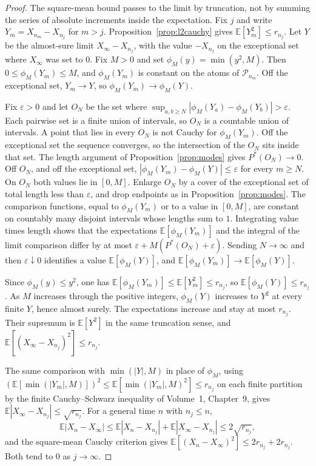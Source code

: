 \begin{proof}
The square-mean bound passes to the limit by truncation, not by summing the series of absolute increments inside the expectation. Fix $j$ and write $Y_m=X_{n_m}-X_{n_j}$ for $m>j$. Proposition~\ref{prop:l2cauchy} gives $\mathbb E[Y_m^2]\le r_{n_j}$. Let $Y$ be the almost-sure limit $X_\infty-X_{n_j}$, with the value $-X_{n_j}$ on the exceptional set where $X_\infty$ was set to $0$. Fix $M>0$ and set $\phi_M(y)=\min(y^2,M)$. Then $0\le\phi_M(Y_m)\le M$, and $\phi_M(Y_m)$ is constant on the atoms of $\mathcal P_{n_m}$. Off the exceptional set, $Y_m\to Y$, so $\phi_M(Y_m)\to\phi_M(Y)$.

Fix $\varepsilon>0$ and let $O_N$ be the set where $\sup_{a,b\ge N}|\phi_M(Y_a)-\phi_M(Y_b)|>\varepsilon$. Each pairwise set is a finite union of intervals, so $O_N$ is a countable union of intervals. A point that lies in every $O_N$ is not Cauchy for $\phi_M(Y_m)$. Off the exceptional set the sequence converges, so the intersection of the $O_N$ sits inside that set. The length argument of Proposition~\ref{prop:modes} gives $P^*(O_N)\to0$. Off $O_N$, and off the exceptional set, $|\phi_M(Y_m)-\phi_M(Y)|\le\varepsilon$ for every $m\ge N$. On $O_N$ both values lie in $[0,M]$. Enlarge $O_N$ by a cover of the exceptional set of total length less than $\varepsilon$, and drop endpoints as in Proposition~\ref{prop:modes}. The comparison functions, equal to $\phi_M(Y_m)$ or to a value in $[0,M]$, are constant on countably many disjoint intervals whose lengths sum to $1$. Integrating value times length shows that the expectations $\mathbb E[\phi_M(Y_m)]$ and the integral of the limit comparison differ by at most $\varepsilon+M(P^*(O_N)+\varepsilon)$. Sending $N\to\infty$ and then $\varepsilon\downarrow0$ identifies a value $\mathbb E[\phi_M(Y)]$, and $\mathbb E[\phi_M(Y_m)]\to\mathbb E[\phi_M(Y)]$.

Since $\phi_M(y)\le y^2$, one has $\mathbb E[\phi_M(Y_m)]\le\mathbb E[Y_m^2]\le r_{n_j}$, so $\mathbb E[\phi_M(Y)]\le r_{n_j}$. As $M$ increases through the positive integers, $\phi_M(Y)$ increases to $Y^2$ at every finite $Y$, hence almost surely. The expectations increase and stay at most $r_{n_j}$. Their supremum is $\mathbb E[Y^2]$ in the same truncation sense, and $\mathbb E[(X_\infty-X_{n_j})^2]\le r_{n_j}$.

The same comparison with $\min(|Y|,M)$ in place of $\phi_M$, using $(\mathbb E[\min(|Y_m|,M)])^2\le\mathbb E[\min(|Y_m|,M)^2]\le r_{n_j}$ on each finite partition by the finite Cauchy--Schwarz inequality of Volume~1, Chapter~9, gives $\mathbb E|X_\infty-X_{n_j}|\le\sqrt{r_{n_j}}$. For a general time $n$ with $n_j\le n$,
\[
 \mathbb E|X_n-X_\infty|
 \le\mathbb E|X_n-X_{n_j}|+\mathbb E|X_\infty-X_{n_j}|
 \le2\sqrt{r_{n_j}},
\]
and the square-mean Cauchy criterion gives $\mathbb E[(X_n-X_\infty)^2]\le 2r_{n_j}+2r_{n_j}$. Both tend to $0$ as $j\to\infty$.


\end{proof}
